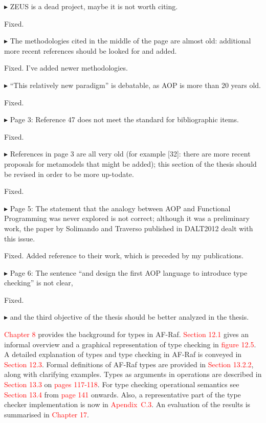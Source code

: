 \documentclass{article}
\newcommand*\R[1]{\textcolor{red}{#1}} %
\newenvironment{them}%
  {\bigskip\noindent\begingroup\color{blue}$\blacktriangleright$\enspace}%
  {\endgroup\par}
\begin{document}
\begin{them}
ZEUS is a dead project, maybe it is not worth citing.
\end{them}
Fixed.

\begin{them}
The methodologies cited in the middle of the page are almost old: additional
more recent references should be looked for and added.
\end{them}
Fixed. I've added newer methodologies.

\begin{them}
``This relatively new paradigm'' is debatable, as AOP is more than 20 years old.
\end{them}
Fixed.

\begin{them}
Page 3:
Reference 47 does not meet the standard for bibliographic items.
\end{them}
Fixed.

\begin{them}
References in page 3 are all very old (for example [32]: there are more recent
proposals for metamodels that might be added); this section of the thesis
should be revised in order to be more up-todate.
\end{them}
Fixed.

\begin{them}
Page 5:
The statement that the analogy between AOP and Functional Programming was never
explored is not correct; although it was a preliminary work, the paper by
Solimando and Traverso published in DALT2012 dealt with this issue.
\end{them}
Fixed. Added reference to their work, which is preceded by my publications.

\begin{them}
Page 6:
The sentence ``and design the first AOP language to introduce type checking'' is
not clear,
\end{them}
Fixed.

\begin{them}
and the third objective of the thesis should be better analyzed in
the thesis.
\end{them}
\R{Chapter 8} provides the background for types in AF-Raf. \R{Section 12.1}
gives an informal overview and a graphical representation of type checking in
\R{figure 12.5}. A detailed explanation of types and type checking in AF-Raf is
conveyed in \R{Section 12.3}. Formal definitions of AF-Raf types are provided
in \R{Section 13.2.2}, along with clarifying examples. Types as arguments in
operations are described in \R{Section 13.3 } on \R{pages 117-118}. For type
checking operational semantics see \R{Section 13.4} from \R{page 141} onwards.
Also, a representative part of the type checker implementation is now in
\R{Apendix~C.3}. An evaluation of the results is summarised in \R{Chapter 17}.
\end{document}
